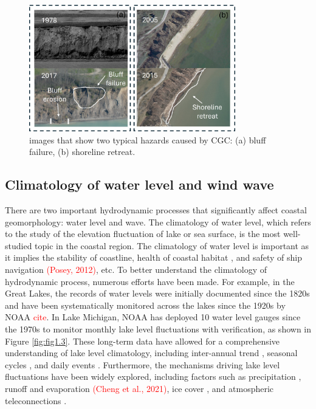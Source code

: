 \begin{figure}[htbp]
  \centering
  \includegraphics[width=0.8\textwidth]{chapter1/resources/figure1-2.jpg}
  \caption{images that show two typical hazards caused by CGC: (a) bluff failure, (b) shoreline retreat.}
  \label{fig:fig1.2}
\end{figure}


\subsection{Climatology of water level and wind wave}
\label{subsec:Climatology of water level and wind wave}

There are two important hydrodynamic processes that significantly affect coastal geomorphology: water level and wave. The climatology of water level, which refers to the study of the elevation fluctuation of lake or sea surface, is the most well-studied topic in the coastal region. The climatology of water level is important as it implies the stability of coastline, health of coastal habitat \citep{theuerkauf_rapid_2021}, and safety of ship navigation \textcolor{red}{(Posey, 2012)}, etc. To better understand the climatology of hydrodynamic process, numerous efforts have been made. For example, in the Great Lakes, the records of water levels were initially documented since the 1820s \citep{foster_report_1851} and have been systematically monitored across the lakes since the 1920s by NOAA \textcolor{red}{cite}. In Lake Michigan, NOAA has deployed 10 water level gauges since the 1970s to monitor monthly lake level fluctuations with verification, as shown in Figure \ref{fig:fig1.3}. These long-term data have allowed for a comprehensive understanding of lake level climatology, including inter-annual trend \citep{hanrahan_attribution_2014,chen_understanding_2022}, seasonal cycles \citep{argyilan_lake_2003,quinn_secular_2002}, and daily events \citep{trebitz_characterizing_2006}. Furthermore, the mechanisms driving lake level fluctuations have been widely explored, including factors such as precipitation \citep{rodionov_association_1994,hanrahan_attribution_2014}, runoff and evaporation \cite{gronewold_tug--war_2021,gronewold_hydrological_2016} \textcolor{red}{(Cheng et al., 2021)}, ice cover \citep{farhadzadeh_study_2017}, and atmospheric teleconnections \citep{ghanbari_coherence_2008}.

